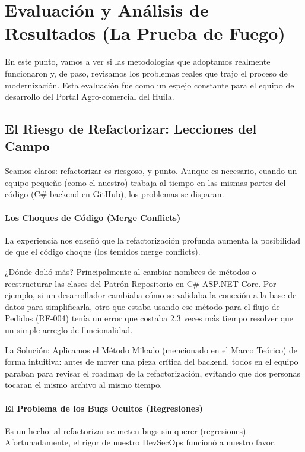 \section{Evaluación y Análisis de Resultados (La Prueba de Fuego)}

En este punto, vamos a ver si las metodologías que adoptamos realmente funcionaron y, de paso, revisamos los problemas reales que trajo el proceso de modernización. Esta evaluación fue como un espejo constante para el equipo de desarrollo del Portal Agro-comercial del Huila.

\subsection{El Riesgo de Refactorizar: Lecciones del Campo}

Seamos claros: refactorizar es riesgoso, y punto. Aunque es necesario, cuando un equipo pequeño (como el nuestro) trabaja al tiempo en las mismas partes del código (C\# backend en GitHub), los problemas se disparan.

\paragraph{Los Choques de Código (Merge Conflicts)}

La experiencia nos enseñó que la refactorización profunda aumenta la posibilidad de que el código choque (los temidos merge conflicts).

¿Dónde dolió más? Principalmente al cambiar nombres de métodos o reestructurar las clases del Patrón Repositorio en C\# ASP.NET Core. Por ejemplo, si un desarrollador cambiaba cómo se validaba la conexión a la base de datos para simplificarla, otro que estaba usando ese método para el flujo de Pedidos (RF-004) tenía un error que costaba 2.3 veces más tiempo resolver que un simple arreglo de funcionalidad.

La Solución: Aplicamos el Método Mikado (mencionado en el Marco Teórico) de forma intuitiva: antes de mover una pieza crítica del backend, todos en el equipo paraban para revisar el roadmap de la refactorización, evitando que dos personas tocaran el mismo archivo al mismo tiempo.

\paragraph{El Problema de los Bugs Ocultos (Regresiones)}

Es un hecho: al refactorizar se meten bugs sin querer (regresiones). Afortunadamente, el rigor de nuestro DevSecOps funcionó a nuestro favor.

